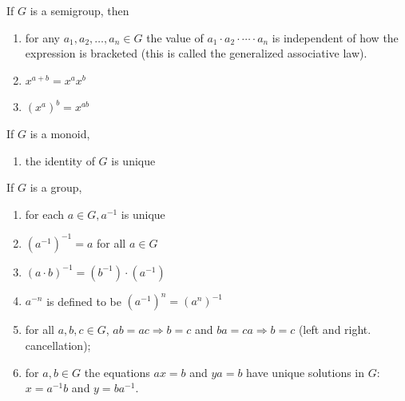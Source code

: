 \begin{proposition}
    If $G$ is a semigroup, then
    \begin{enumerate}
        \item
              for any $a_1, a_2, \ldots, a_n \in G$ the value of $a_1 \cdot a_2 \cdot \cdots \cdot a_n$ is independent of how the expression is bracketed (this is called the generalized associative law).

        \item
              $x^{a+b}=x^a x^b$

        \item
              $\left(x^a\right)^b=x^{a b}$
    \end{enumerate}
    If $G$ is a monoid,
    \begin{enumerate}[resume]
        \item  the identity of $G$ is unique
    \end{enumerate}
    If $G$ is a group,
    \begin{enumerate}[resume]
        \item
              for each $a \in G, a^{-1}$ is unique

        \item
              $\left(a^{-1}\right)^{-1}=a$ for all $a \in G$

        \item
              $(a \cdot b)^{-1}=\left(b^{-1}\right) \cdot\left(a^{-1}\right)$

        \item
              $a^{-n}$ is defined to be $\left(a^{-1}\right)^n=\left(a^n\right)^{-1}$

        \item
              for all $a, b, c \in G$, $ab=ac \Rightarrow b=c$ and $ba=ca \Rightarrow b=c$ (left and right. cancellation);

        \item
              for $a, b \in G$ the equations $ax=b$ and $ya=b$ have unique solutions in $G$: $x=a^{-1} b$ and $y=ba^{-1}$.
    \end{enumerate}
\end{proposition}

